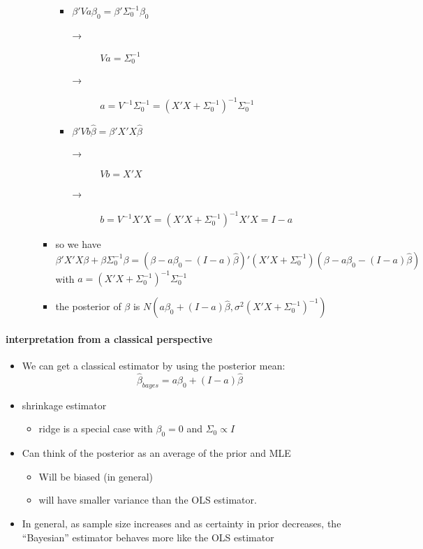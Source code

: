 \begin{itemize}
\begin{itemize}
\begin{itemize}
\begin{itemize}
\item $\beta'V a \beta_0 = \beta'\Sigma_0^{-1}\beta_0$
\begin{description}
\item[→] $V a = \Sigma_0^{-1}$
\item[→] $a = V^{-1} \Sigma_0^{-1} = (X'X + \Sigma_0^{-1})^{-1} \Sigma_0^{-1}$
\end{description}
\item $\beta'V b \hat\beta = \beta'X'X \hat\beta$
\begin{description}
\item[→] $V b = X'X$
\item[→] $b = V^{-1} X'X = (X'X + \Sigma_0^{-1})^{-1} X'X = I -
                a$
\end{description}
\end{itemize}
\item so we have 
            \[\beta'X'X\beta + \beta \Sigma_0^{-1} \beta = (\beta - a
            \beta_0 - (I - a) \hat\beta)'(X'X + \Sigma_0^{-1}) (\beta - a
            \beta_0 - (I - a) \hat\beta)\]
            with $a = (X'X + \Sigma_0^{-1})^{-1}\Sigma_0^{-1}$
\item the posterior of $\beta$ is $N(a \beta_0 + (I - a)\hat\beta,
            \sigma^2 (X'X + \Sigma_0^{-1})^{-1})$
\end{itemize}
\end{itemize}
\end{itemize}
\paragraph{interpretation from a classical perspective}
\label{sec-4-1-2}

\begin{itemize}
\item We can get a classical estimator by using the posterior mean:
        \[ \hat{\beta}_{bayes} = a \beta_{0} + (I - a)\hat{\beta} \]
\item shrinkage estimator
\begin{itemize}
\item ridge is a special case with $\beta_0 = 0$ and $\Sigma_0 \propto I$
\end{itemize}
\item Can think of the posterior as an average of the prior and MLE
\begin{itemize}
\item Will be biased (in general)
\item will have smaller variance than the OLS estimator.
\end{itemize}
\item In general, as sample size increases and as certainty in
        prior decreases, the ``Bayesian'' estimator behaves more like the
        OLS estimator
\end{itemize}
